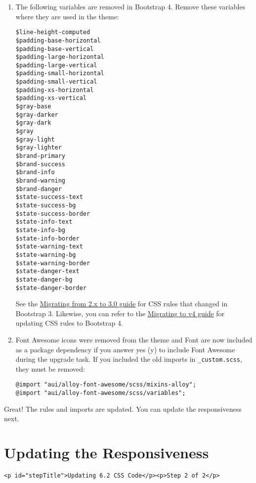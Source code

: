 \begin{enumerate}
\def\labelenumi{\arabic{enumi}.}
\setcounter{enumi}{1}
\item
  The following variables are removed in Bootstrap 4. Remove these
  variables where they are used in the theme:

\begin{verbatim}
$line-height-computed
$padding-base-horizontal
$padding-base-vertical
$padding-large-horizontal
$padding-large-vertical
$padding-small-horizontal
$padding-small-vertical
$padding-xs-horizontal
$padding-xs-vertical
$gray-base
$gray-darker
$gray-dark
$gray
$gray-light
$gray-lighter
$brand-primary
$brand-success
$brand-info
$brand-warning
$brand-danger
$state-success-text
$state-success-bg
$state-success-border
$state-info-text
$state-info-bg
$state-info-border
$state-warning-text
$state-warning-bg
$state-warning-border
$state-danger-text
$state-danger-bg
$state-danger-border
\end{verbatim}

  See the
  \href{http://getbootstrap.com/migration/\#migrating-from-2x-to-30}{Migrating
  from 2.x to 3.0 guide} for CSS rules that changed in Bootstrap 3.
  Likewise, you can refer to the
  \href{https://getbootstrap.com/docs/4.3/migration/}{Migrating to v4
  guide} for updating CSS rules to Bootstrap 4.
\item
  Font Awesome icons were removed from the theme and Font are now
  included as a package dependency if you answer yes (y) to include Font
  Awesome during the upgrade task. If you included the old imports in
  \texttt{\_custom.scss}, they must be removed:

\begin{verbatim}
@import "aui/alloy-font-awesome/scss/mixins-alloy";
@import "aui/alloy-font-awesome/scss/variables";
\end{verbatim}
\end{enumerate}

Great! The rules and imports are updated. You can update the
responsiveness next.

\chapter{Updating the Responsiveness}\label{updating-the-responsiveness}

\begin{verbatim}
<p id="stepTitle">Updating 6.2 CSS Code</p><p>Step 2 of 2</p>
\end{verbatim}

